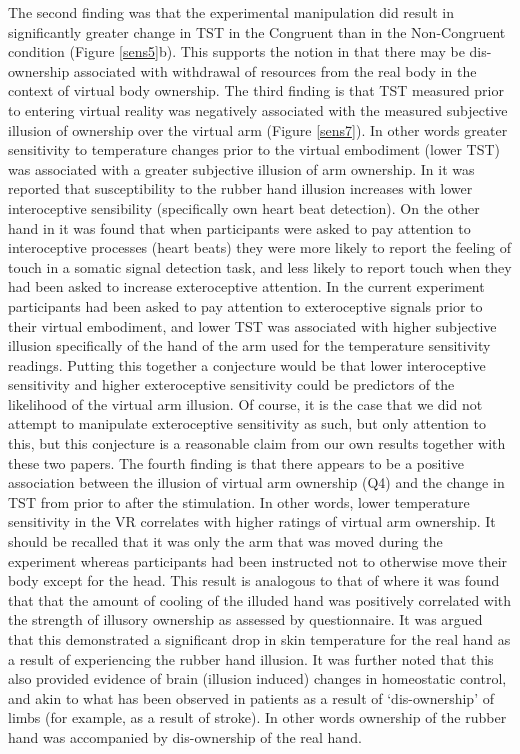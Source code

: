 \documentclass[
		twoside,openright,titlepage,numbers=noenddot,manychapters,
		headinclude,%
                footinclude=false,cleardoublepage=empty,
                BCOR=5mm,
		fontsize=11pt, %
                 enabledeprecatedfontcommands]{scrreprt}
\begin{document}
The second finding was that the experimental manipulation did result in significantly greater change in TST in the Congruent than in the Non-Congruent condition (Figure \ref{sens5}b). This supports the notion in \cite{Moseley2008a} that there may be dis-ownership associated with withdrawal of resources from the real body in the context of virtual body ownership. 
The third finding is that TST measured prior to entering virtual reality was negatively associated with the measured subjective illusion of ownership over the virtual arm (Figure \ref{sens7}).  In other words greater sensitivity to temperature changes prior to the virtual embodiment (lower TST) was associated with a greater subjective illusion of arm ownership. In \cite{Tsakiris2011} it was reported that susceptibility to the rubber hand illusion increases with lower interoceptive sensibility (specifically own heart beat detection). On the other hand in 
\cite{Mirams2011} it was found that when participants were asked to pay attention to interoceptive processes (heart beats) they were more likely to report the feeling of touch  in a somatic signal detection task, and less likely to report touch when they had been asked to increase exteroceptive attention.  In the current experiment participants had been asked to pay attention to exteroceptive signals prior to their virtual embodiment, and lower TST was associated with higher subjective illusion specifically of the hand of the arm used for the temperature sensitivity readings. Putting this together a conjecture would be that lower interoceptive sensitivity and higher exteroceptive sensitivity could be predictors of the likelihood of the virtual arm illusion. Of course, it is the case that we did not attempt to manipulate exteroceptive sensitivity as such, but only attention to this, but this conjecture is a reasonable claim from our own results together with these two papers. 
The fourth finding is that there appears to be a positive association between the illusion of virtual arm ownership (Q4) and the change in TST from prior to after the stimulation. In other words, lower temperature sensitivity in the VR correlates with higher ratings of virtual arm ownership. It should be recalled that it was only the arm that was moved during the experiment whereas participants had been instructed not to otherwise move their body except for the head. This result is analogous to that of \cite{Moseley2008a}
 where it was found that that the amount of cooling of the illuded hand was positively correlated with the strength of illusory ownership as assessed by questionnaire. It was argued that this demonstrated a significant drop in skin temperature for the real hand as a result of experiencing the rubber hand illusion. It was further noted that this also provided evidence of brain (illusion induced) changes in homeostatic control, and akin to what has been observed in patients as a result of ‘dis-ownership’ of limbs (for example, as a result of stroke).  In other words ownership of the rubber hand was accompanied by dis-ownership of the real hand.
\end{document}
